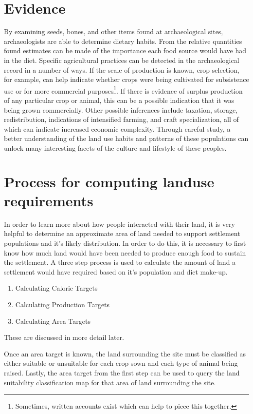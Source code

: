 \section{Evidence} \label{sec:Evidence} By examining seeds, bones, and other
items found at archaeological sites, archaeologists are able to determine 
dietary habits. From the relative quantities found estimates can be made of the
importance each food source would have had in the diet.  Specific agricultural
practices
can be detected in the archaeological record in a number of ways.  If the scale
of production is known, crop selection, for example, can help indicate whether
crops were being cultivated for subsistence use or for more commercial
purposes\footnote{Sometimes, written accounts exist which can help to
piece this together.}.  If there is evidence of surplus production of any
particular crop or animal, this can be a possible indication that it was being
grown commercially.  Other possible inferences include taxation, storage,
redistribution, indications of intensified farming, and craft specialization,
all of which can indicate increased economic complexity.  Through careful
study, a better understanding of the land use habits and patterns of these
populations can unlock many interesting facets of the culture and lifestyle of
these peoples.

\section{Process for computing landuse requirements} \label{sec:EarlyAttempts} 

In order to learn more about how people interacted with their land, it is very
helpful to determine an approximate area of land needed to support settlement
populations and it's likely distribution.  In order to do this, it is necessary
to first know how much land would have been needed to produce enough food to
sustain the settlement.  A three step process is used to calculate the amount of
land a settlement would have required based on it's population and diet
make-up.  

\begin{enumerate}
 \item Calculating Calorie Targets
 \item Calculating Production Targets
 \item Calculating Area Targets
\end{enumerate}
These are discussed in more detail later.

Once an area target is known, the land surrounding the
site must be classified as either suitable or unsuitable for each crop sown and
each type of animal being raised.  Lastly, the area target from the first step
can be used to query the land suitability classification map for that area of
land surrounding the site.

